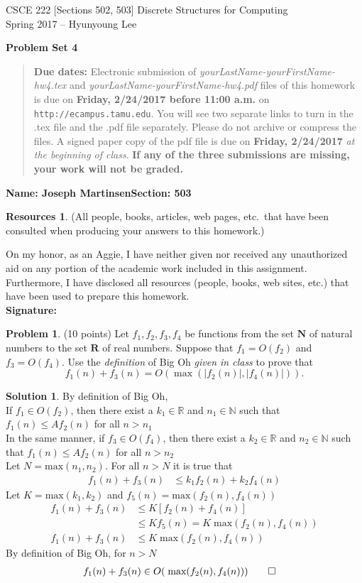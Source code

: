 \documentclass{article}
\theoremstyle{definition}
\newtheorem{problem}{Problem}
\newtheorem*{solution}{Solution}
\newtheorem*{resources}{Resources}
\newcommand{\name}[2]{\noindent\textbf{Name: #1}\hfill \textbf{Section: #2}}
\newcommand{\honor}{\noindent On my honor, as an Aggie, I have neither
  given nor received any unauthorized aid on any portion of the
  academic work included in this assignment. Furthermore, I have
  disclosed all resources (people, books, web sites, etc.) that have
  been used to prepare this homework. \\[2ex]
 \textbf{Signature:} \underline{\hspace*{10cm}} }
\newcommand{\problemset}[1]{\begin{center}\textbf{Problem Set #1}\end{center}}
\newcommand{\duedate}[2]{\begin{quote}\textbf{Due dates:} Electronic
    submission of \textsl{yourLastName-yourFirstName-hw4.tex} and 
    \textsl{yourLastName-yourFirstName-hw4.pdf} files of this homework is due on
    \textbf{#1} on \texttt{http://ecampus.tamu.edu}. You will see two separate links
    to turn in the .tex file and the .pdf file separately. Please do not archive or compress the files.  
    A signed paper copy of the pdf file is due on \textbf{#2} \textsl{at the beginning of class}.
    \textbf{If any of the three submissions are missing, your work will not be graded.}\end{quote} }
\newcommand{\N}{\mathbf{N}}
\newcommand{\R}{\mathbf{R}}
\begin{document}
\vspace*{-15mm}
\begin{center}
{\large
CSCE 222 [Sections 502, 503] Discrete Structures for Computing\\[.5ex]
Spring 2017 -- Hyunyoung Lee\\}
\end{center}
\problemset{4}
\duedate{Friday, 2/24/2017 before 11:00 a.m.}{Friday, 2/24/2017}
\name{Joseph Martinsen}{503}
\begin{resources} (All people, books, articles, web pages, etc.\ that
  have been consulted when producing your answers to this homework.)
\end{resources}
\honor

\smallskip

\begin{problem} (10 points)
Let $f_1, f_2, f_3, f_4$ be functions from the set $\N$ of natural numbers
to the set $\R$ of real numbers. Suppose that $f_1= O(f_2)$ and
$f_3=O(f_4)$. Use the \textit{definition} of Big Oh \textit{given in class} to prove that 
$$f_1(n) + f_3(n) = O(\max(|f_2(n)|,  |f_4(n)| ) ).$$
\end{problem}
\begin{solution}
By definition of Big Oh, \\
If $f_1 \in O(f_2)$, then there exist a $k_1 \in \mathbb{R}$ and $n_1 \in \mathbb{N}$ such that $f_1(n) \le Af_2(n)$ for all $n>n_1$\\
In the same manner, if $f_3 \in O(f_4)$, then there exist a $k_2 \in \mathbb{R}$ and $n_2 \in \mathbb{N}$ such that $f_1(n) \le Af_2(n)$ for all $n>n_2$ \\
Let $N = \text{max}(n_1,n_2)$. For all $n > N$ it is true that
\begin{align*}
  f_1(n) + f_3(n) &\le k_1 f_2(n) + k_2 f_4(n)
\end{align*}
Let $K = \text{max}(k_1,k_2)$ and $f_5(n) = \text{max}(f_2(n),f_4(n))$
\begin{align*}
  f_1(n) + f_3(n) &\le K[f_2(n) + f_4(n)] \\
  &\le K f_5(n) = K \;\text{max}(f_2(n),f_4(n)) \\
    f_1(n) + f_3(n) &\le K \;\text{max}(f_2(n),f_4(n))
\end{align*}
By definition of Big Oh, for $n > N$
\begin{align*}
  f_1(n) + f_3(n) &\in O( \;\text{max}(f_2(n),f_4(n))) \qed
\end{align*}
\end{solution}
\end{document}
